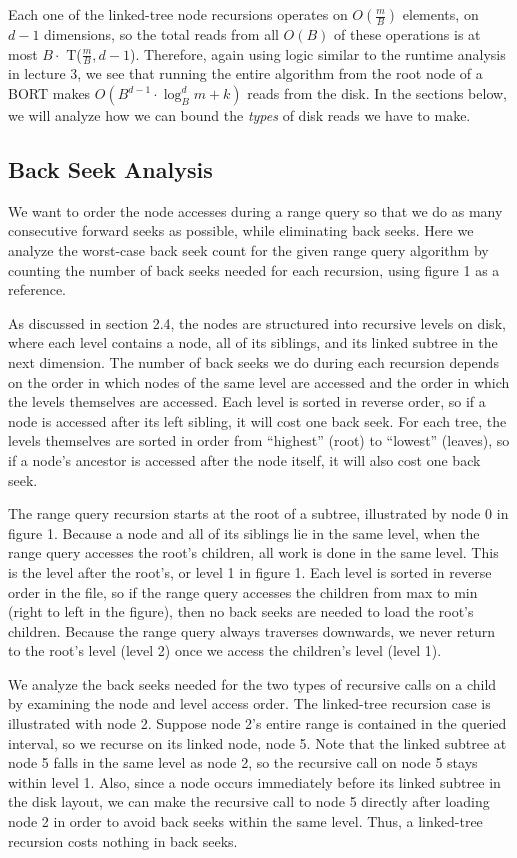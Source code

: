 \documentclass[11pt, oneside]{article}
\begin{document}
Each one of the linked-tree node recursions operates on $O(\frac{m}{B})$
elements, on $d-1$ dimensions, so the total reads from all $O(B)$ of these
operations is at most $B \cdot$ T($\frac{m}{B}, d-1$). Therefore, again using
logic similar to the runtime analysis in lecture 3, we see that running the
entire algorithm from the root node of a BORT makes $O(B^{d-1}\cdot\log_B^d m +
k)$ reads from the disk. In the sections below, we will analyze how we can bound
the \textit{types} of disk reads we have to make.

\subsection{Back Seek Analysis}

We want to order the node accesses during a range query so that we do as many
consecutive forward seeks as possible, while eliminating back seeks. Here we
analyze the worst-case back seek count for the given range query algorithm by
counting the number of back seeks needed for each recursion, using figure 1 as a
reference. 

As discussed in section 2.4, the nodes are structured into recursive levels on
disk, where each level contains a node, all of its siblings, and its linked
subtree in the next dimension. The number of back seeks we do during each
recursion depends on the order in which nodes of the same level are accessed and
the order in which the levels themselves are accessed. Each level is sorted in
reverse order, so if a node is accessed after its left sibling, it will cost one
back seek. For each tree, the levels themselves are sorted in order from
``highest'' (root) to ``lowest'' (leaves), so if a node's ancestor is accessed
after the node itself, it will also cost one back seek. 

The range query recursion starts at the root of a subtree, illustrated by node
0 in figure 1. Because a node and all of its siblings lie in the same level,
when the range query accesses the root's children, all work is done in the same
level. This is the level after the root's, or level 1 in figure 1. Each level
is sorted in reverse order in the file, so if the range query accesses the
children from max to min (right to left in the figure), then no back seeks are
needed to load the root's children. Because the range query always traverses
downwards, we never return to the root's level (level 2) once we access the
children's level (level 1). 

We analyze the back seeks needed for the two types of recursive calls on a child
by examining the node and level access order. The linked-tree recursion case is
illustrated with node 2. Suppose node 2's entire range is contained in the queried interval, so we recurse on its linked node, node 5. Note that the linked
subtree at node 5 falls in the same level as node 2, so the recursive call on
node 5 stays within level 1. Also, since a node occurs immediately before its
linked subtree in the disk layout, we can make the recursive call to node 5
directly after loading node 2 in order to avoid back seeks within the same
level. Thus, a linked-tree recursion costs nothing in back seeks.
\end{document}

